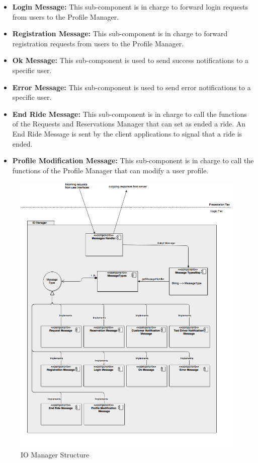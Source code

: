 \documentclass[../../../../../../../dd.tex]{subfiles}
\begin{document}
\begin{itemize}
			\item \textbf{Login Message:} This sub-component is in charge to forward login requests from users to the Profile Manager.

			\item \textbf{Registration Message:} This sub-component is in charge to forward registration requests from users to the Profile Manager.

			\item \textbf{Ok Message:} This sub-component is used to send success notifications to a specific user.

			\item \textbf{Error Message:} This sub-component is used to send error notifications to a specific user.

			\item \textbf{End Ride Message:} This sub-component is in charge to call the functions of the Requests and Reservations Manager that can set as ended a ride. An End Ride Message is sent by the client applications to signal that a ride is ended.

			\item \textbf{Profile Modification Message:} This sub-component is in charge to call the functions of the Profile Manager that can modify a user profile.
			
		\end{itemize}

		\begin{figure}[H]
				\centering
				\includegraphics[width=\textwidth, scale=0.5]{../images/IOManager.png}
			\caption{IO Manager Structure}\label{fig:IOManager}
		\end{figure}
	
\end{document}
